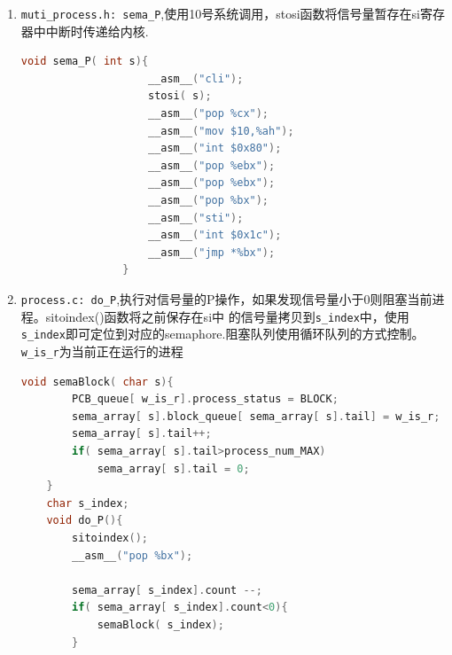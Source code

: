 \documentclass[a4paper]{article}
\begin{document}
{\begin{enumerate}
{\begin{lstlisting}[language={C}]
			__asm__("pop %bx");
			__asm__("pop %bx");
			__asm__("pop %bx");
			__asm__("jmp *%bx");  //back to os_syscall callrun
		}
 		\end{lstlisting}}
	 \item \verb|muti_process.h: sema_P|,使用10号系统调用，stosi函数将信号量暂存在si寄存器中中断时传递给内核.
		{\scriptsize\begin{lstlisting}[language={C}]
				void sema_P( int s){
					__asm__("cli");
					stosi( s);
					__asm__("pop %cx");
					__asm__("mov $10,%ah");
					__asm__("int $0x80");
					__asm__("pop %ebx");
					__asm__("pop %ebx");
					__asm__("pop %bx");
					__asm__("sti");
					__asm__("int $0x1c");
					__asm__("jmp *%bx");
				}
 		\end{lstlisting}}
	 \item \verb|process.c: do_P|,执行对信号量的P操作，如果发现信号量小于0则阻塞当前进程。sitoindex()函数将之前保存在si中
	的信号量拷贝到\verb|s_index|中，使用\verb|s_index|即可定位到对应的semaphore.阻塞队列使用循环队列的方式控制。\verb|w_is_r|为当前正在运行的进程
	{\scriptsize\begin{lstlisting}[language={C}]
	void semaBlock( char s){
		PCB_queue[ w_is_r].process_status = BLOCK;
		sema_array[ s].block_queue[ sema_array[ s].tail] = w_is_r;
		sema_array[ s].tail++;
		if( sema_array[ s].tail>process_num_MAX)
			sema_array[ s].tail = 0;
	}
	char s_index;
	void do_P(){
		sitoindex();
		__asm__("pop %bx");

		sema_array[ s_index].count --;
		if( sema_array[ s_index].count<0){
			semaBlock( s_index);
		}


\end{lstlisting}}
\end{enumerate}}
\end{document}
